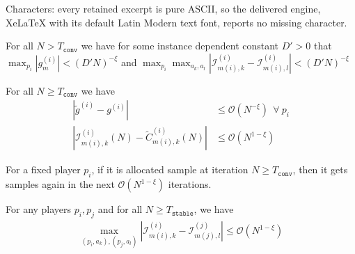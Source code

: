 \documentclass[10pt,a4paper]{amsart}
\begin{document}
Characters: every retained excerpt is pure ASCII, so the delivered engine, XeLaTeX with its default Latin Modern text font, reports no missing character.
\begin{lemma}
   For all $N>T_{\texttt{conv}}$ we have for some instance dependent constant $D'>0$ that $\max_{p_i} |g^{(i)}_{m}|<(D'N)^{-\xi}$ and $ \max_{p_i}\max_{a_k,a_l}|\mathcal{I}^{(i)}_{m(i),k}-\mathcal{I}^{(i)}_{m(i),l}|<(D'N)^{-\xi}$
   \label{lemma:firstorderpi}
\end{lemma}

\begin{lemma}
    For all $N\geq T_{\texttt{conv}}$ we have
      \begin{align*}
      |\tilde{g}^{(i)}-g^{(i)}|&\leq  \mathcal{O}(N^{-\xi})\ \ \forall \ p_i\\
        |\mathcal{I}^{(i)}_{m(i),k}(N)-\tilde{C}^{(i)}_{m(i),k}(N)|&\leq  \mathcal{O}(N^{1-\xi})
    \end{align*}
    \label{lemma:noise}
\end{lemma}

\begin{lemma}
For a fixed player $p_i$, if it is allocated sample at iteration $N\geq T_{\texttt{conv}}$, then it gets samples again in the next $\mathcal{O}(N^{1-\xi})$ iterations.
\label{lemma:playerfreq}
\end{lemma}

\begin{lemma}
    For any players $p_i,p_j$ and for all $N\geq T_{\texttt{stable}}$, we have
\begin{align*}
    \max_{(p_i,a_k),(p_j,a_l)}|\mathcal{I}^{(i)}_{m(i),k}-\mathcal{I}^{(j)}_{m(j),l}|\leq \mathcal{O}(N^{1-\xi})
\end{align*}
\end{lemma}
\end{document}
